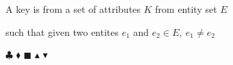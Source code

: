 \documentclass[preview]{standalone} %
\begin{document}
A key is from a set of attributes $K$ from entity set $E$

such that given two entites $e_1$ and $e_2 \in E,\ e_1 \not = e_2$

$\clubsuit$ $\blacklozenge$ $\blacksquare$ $\blacktriangle$ $\blacktriangledown$ \Coffeecup \Football
\textleaf %
\AAcht
\bcstop
\bcetoile
\bcyin
\bctrefle
\faPlane

\end{document}

